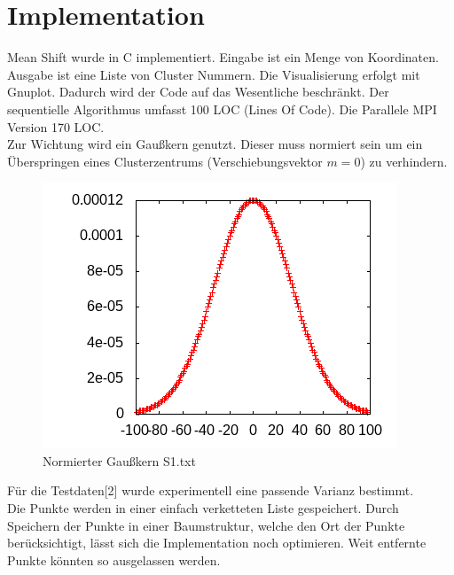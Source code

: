 \section{Implementation}
	Mean Shift wurde in C implementiert. 
	Eingabe ist ein Menge von Koordinaten. Ausgabe ist eine Liste von Cluster Nummern. Die Visualisierung erfolgt mit Gnuplot.
	Dadurch wird der Code auf das Wesentliche beschränkt.
	Der sequentielle Algorithmus umfasst 100 LOC (Lines Of Code). Die Parallele MPI Version 170 LOC.\\
	Zur Wichtung wird ein Gaußkern genutzt. Dieser muss normiert sein um ein Überspringen eines Clusterzentrums (Verschiebungsvektor $ m = 0 $) zu verhindern.\\
	\vspace{-10pt}
	\begin{figure}[H]
		\centering
		\includegraphics[scale=0.8]{../meanshift/output/pics/gauss.png} 
		\caption{Normierter Gaußkern S1.txt}
	\end{figure}
	Für die Testdaten[2] wurde experimentell eine passende Varianz bestimmt.\\
	Die Punkte werden in einer einfach verketteten Liste gespeichert. Durch Speichern der Punkte in einer Baumstruktur, welche den Ort der
	Punkte berücksichtigt, lässt sich die Implementation noch optimieren. Weit entfernte Punkte könnten so ausgelassen werden.\\

